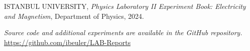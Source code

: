 \documentclass[journal]{IEEEtran}
\begin{document}
\begin{thebibliography}{9}
    ISTANBUL UNIVERSITY, \textit{Physics Laboratory II Experiment Book: Electricity and Magnetism}, Department of Physics, 2024.

    \textit{Source code and additional experiments are available in the GitHub repository.} \url{https://github.com/ibeuler/LAB-Reports}
\end{thebibliography}
\end{document}
